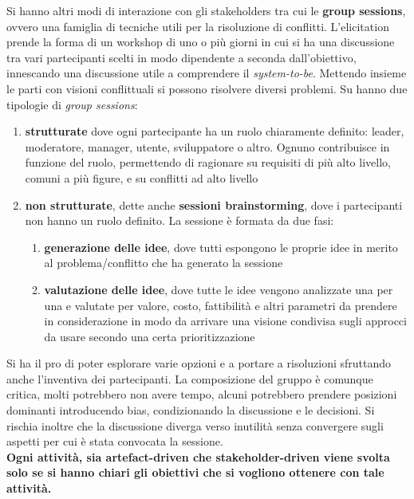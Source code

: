 Si hanno altri modi di interazione con gli stakeholders tra cui le \textbf{group sessions}, ovvero una famiglia di tecniche utili per la risoluzione di conflitti. L'elicitation prende la forma di un workshop di uno o più giorni in cui si ha una discussione tra vari partecipanti scelti in modo dipendente a seconda dall'obiettivo, innescando una discussione utile a comprendere il \textit{system-to-be}. Mettendo insieme le parti con visioni conflittuali si possono risolvere diversi problemi. Su hanno due tipologie di \textit{group sessions}:
\begin{enumerate}
  \item \textbf{strutturate} dove ogni partecipante ha un ruolo chiaramente definito: leader, moderatore, manager, utente, sviluppatore o altro. Ognuno contribuisce in funzione del ruolo, permettendo di ragionare su requisiti di più alto livello, comuni a più figure, e su conflitti ad alto livello
  \item \textbf{non strutturate}, dette anche \textbf{sessioni brainstorming}, dove i partecipanti non hanno un ruolo definito. La sessione è formata da due fasi:
  \begin{enumerate}
    \item \textbf{generazione delle idee}, dove tutti espongono le proprie idee in merito al problema/conflitto che ha generato la sessione
    \item \textbf{valutazione delle idee}, dove tutte le idee vengono analizzate una per una e valutate per valore, costo, fattibilità e altri parametri da prendere in considerazione in modo da arrivare una visione condivisa sugli approcci da usare secondo una certa prioritizzazione
  \end{enumerate}
\end{enumerate}
Si ha il pro di poter esplorare varie opzioni e a portare a risoluzioni sfruttando anche l'inventiva dei partecipanti. La composizione del gruppo è comunque critica, molti potrebbero non avere tempo, alcuni potrebbero prendere posizioni dominanti introducendo bias, condizionando la discussione e le decisioni. Si rischia inoltre che la discussione diverga verso inutilità senza convergere sugli aspetti per cui è stata convocata la sessione.\\ \textbf{Ogni attività, sia artefact-driven che stakeholder-driven viene svolta solo se si hanno chiari gli obiettivi che si vogliono ottenere con tale attività.}
